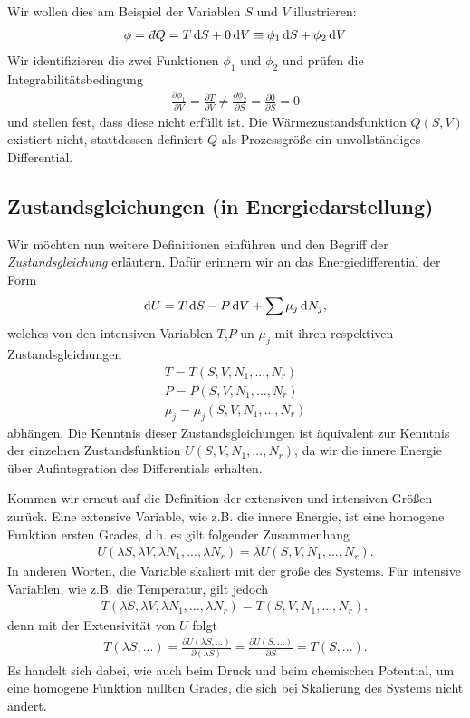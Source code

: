 Wir wollen dies am Beispiel der Variablen $S$ und $V$ illustrieren:
\begin{align}
    \phi = \udiff Q = T\diff S+0 \diff V\equiv \phi_1\diff S+\phi_2 \diff V
\end{align}
Wir identifizieren die zwei Funktionen $\phi_1$ und $\phi_2$ und prüfen die Integrabilitätsbedingung
\begin{align}
    \frac{\partial \phi_1}{\partial V} = \frac{\partial T}{\partial V}\neq \frac{\partial \phi_2}{\partial S}=\frac{\partial0}{\partial S}=0
\end{align}
und stellen fest, dass diese nicht erfüllt ist. Die Wärmezustandsfunktion $Q(S,V)$ existiert nicht, stattdessen definiert $Q$ als Prozessgröße ein unvollständiges Differential.

\subsection{Zustandsgleichungen (in Energiedarstellung)}
Wir möchten nun weitere Definitionen einführen und den Begriff der \textit{Zustandsgleichung} erläutern. Dafür erinnern wir an das Energiedifferential der Form 
\begin{align}
    \mathop{}\!\mathrm{d} U = T\mathop{}\!\mathrm{d} S -P\mathop{}\!\mathrm{d} V + \sum\mu_j\mathop{}\!\mathrm{d} N_j,
\end{align}
welches von den intensiven Variablen $T$,$P$ un $\mu_j$ mit ihren respektiven Zustandsgleichungen 
\begin{align}
    T=T(S,V,N_1,...,N_r)\\
    P=P(S,V,N_1,...,N_r)\\
    \mu_j=\mu_j(S,V,N_1,...,N_r)
\end{align}
abhängen. Die Kenntnis dieser Zustandsgleichungen ist äquivalent zur Kenntnis der einzelnen Zustandsfunktion $U(S,V,N_1,...,N_r)$, da wir die innere Energie über Aufintegration des Differentials erhalten.

Kommen wir erneut auf die Definition der extensiven und intensiven Größen zurück. Eine extensive Variable, wie z.B. die innere Energie, ist eine homogene Funktion ersten Grades, d.h. es gilt folgender Zusammenhang
\begin{align}
    U(\lambda S,\lambda V,\lambda N_1,...,\lambda N_r) = \lambda U(S,V,N_1,...,N_r).
\end{align}
In anderen Worten, die Variable skaliert mit der größe des Systems.
Für intensive Variablen, wie z.B. die Temperatur, gilt jedoch 
\begin{align}
    T(\lambda S,\lambda V,\lambda N_1,...,\lambda N_r)=T(S,V,N_1,...,N_r),
\end{align}
denn mit der Extensivität von $U$ folgt 
\begin{align}
    T(\lambda S,...) = \frac{\partial U(\lambda S,...)}{\partial(\lambda S)}=\frac{\partial U(S,...)}{\partial S}=T(S,...).
\end{align}
Es handelt sich dabei, wie auch beim Druck und beim chemischen Potential, um eine homogene Funktion nullten Grades, die sich bei Skalierung des Systems nicht ändert.

